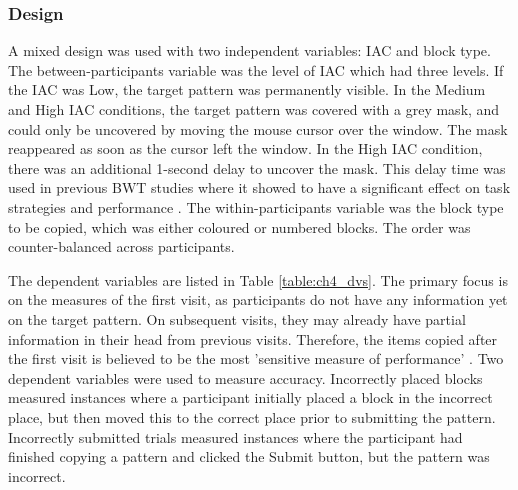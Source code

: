 \subsubsection{Design}
A mixed design was used with two independent variables: IAC and block type.
The between-participants variable was the level of IAC which had three levels. If the IAC was Low, the target pattern was permanently visible. In the Medium and High IAC conditions, the target pattern was covered with a grey mask, and could only be uncovered by moving the mouse cursor over the window. The mask reappeared as soon as the cursor left the window. In the High IAC condition, there was an additional 1-second delay to uncover the mask. This delay time was used in previous BWT studies where it showed to have a significant effect on task strategies and performance \citep{Gray2006, Morgan2009, Waldron2007}.
The within-participants variable was the block type to be copied, which was either coloured or numbered blocks. The order was counter-balanced across participants.

The dependent variables are listed in Table \ref{table:ch4_dvs}. The primary focus is on the measures of the first visit, as participants do not have any information yet on the target pattern. On subsequent visits, they may already have partial information in their head from previous visits. Therefore, the items copied after the first visit is believed to be the most 'sensitive measure of performance' \citep{Janssen2012}. 
Two dependent variables were used to measure accuracy. Incorrectly placed blocks measured instances where a participant initially placed a block in the incorrect place, but then moved this to the correct place prior to submitting the pattern. Incorrectly submitted trials measured instances where the participant had finished copying a pattern and clicked the Submit button, but the pattern was incorrect.

